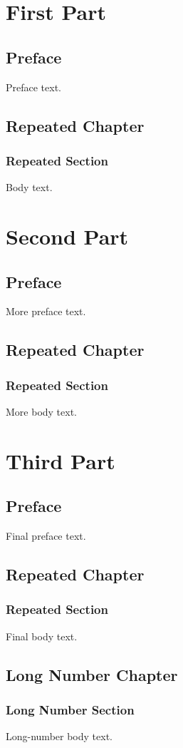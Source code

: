 \documentclass{report}
\begin{document}
\tableofcontents

\part{First Part}
\setcounter{chapter}{0}
\chapter*{Preface}
Preface text.
\chapter{Repeated Chapter}
\section{Repeated Section}
Body text.

\part{Second Part}
\setcounter{chapter}{0}
\chapter*{Preface}
More preface text.
\chapter{Repeated Chapter}
\setcounter{section}{0}
\section{Repeated Section}
More body text.

\part{Third Part}
\setcounter{chapter}{0}
\chapter*{Preface}
Final preface text.
\chapter{Repeated Chapter}
\section{Repeated Section}
Final body text.
\setcounter{chapter}{10}
\chapter{Long Number Chapter}
\setcounter{section}{10}
\section{Long Number Section}
Long-number body text.
\end{document}
